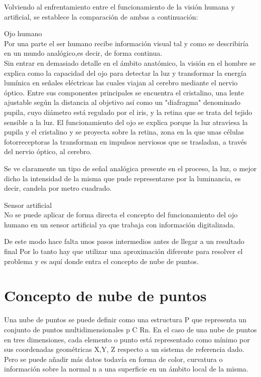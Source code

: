 
Volviendo al enfrentamiento entre el funcionamiento de la visión humana y artificial, se establece la comparación de ambas a continuación:

\begin{list}{•}
\item Ojo humano
\\
Por una parte el ser humano recibe información visual tal y como se describiría en un mundo analógico,es decir, de forma continua.
\\
Sin entrar en demasiado detalle en el ámbito anatómico, la visión en el hombre se explica como la capacidad del ojo para detectar la luz y transformar la energía lumínica en señales eléctricas las cuales viajan al cerebro mediante el nervio óptico. Entre sus componentes principales se encuentra el cristalino, una lente ajustable según la distancia al objetivo así como un "diafragma" denominado pupila, cuyo diámetro está regulado por el iris, y la retina que se trata del tejido sensible a la luz. 
El funcionamiento del ojo se explica porque la luz atraviesa la pupila y el cristalino y se proyecta sobre la retina, zona en la que unas células fotorreceptoras la transforman en impulsos nerviosos que se trasladan, a través del nervio óptico, al cerebro.

Se ve claramente un tipo de señal analógica presente en el proceso, la luz, o mejor dicho la intensidad de la misma que pude representarse por la luminancia, es decir, candela por metro cuadrado.


\item Sensor artificial
\\
No se puede aplicar de forma directa el concepto del funcionamiento del ojo humano en un sensor artificial ya que trabaja con información digitalizada. 

De este modo hace falta unos pasos intermedios antes de llegar a un resultado final Por lo tanto hay que utilizar una aproximación diferente para resolver el problema y es aquí donde entra el concepto de nube de puntos. 
\end{list}

\section{Concepto de nube de puntos}
Una nube de puntos se puede definir como una estructura P que representa un conjunto de puntos multidimensionales p C Rn. En el caso de una nube de puntos en tres dimensiones, cada elemento o punto está representado como mínimo por sus coordenadas geométricas X,Y, Z respecto a un sistema de referencia dado. Pero se puede añadir más datos todavía en forma de color, curvatura o información sobre la normal n a una superficie en un ámbito local de la misma.  



